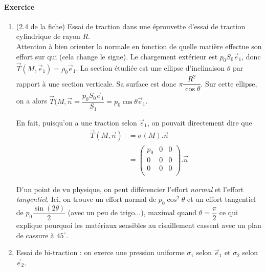 \documentclass{article}
\begin{document}
\paragraph{Exercice}
\begin{enumerate}
\item (2.4 de la fiche) 
Essai de traction dans une éprouvette d'essai de traction cylindrique de rayon $R$.\\
Attention à bien orienter la normale en fonction de quelle matière effectue son effort sur qui (cela change le signe). Le chargement extérieur est $p_0 S_0 \vec{e}_1$, donc $\vec{T}(M,\vec{e}_1)=\rho_0 \vec{e}_1$. La section étudiée est une ellipse d'inclinaison $\theta$ par rapport à  une section verticale. Sa surface est donc $\pi \dfrac{R^2}{\cos \theta}$. Sur cette ellipse, on a alors $\vec{T}(M,\vec{n}=\dfrac{p_0 S_0 \vec{e}_1}{S_1}=p_0\cos \theta \vec{e}_1$.

En fait, puisqu'on a une traction selon $\vec{e}_1$, on pouvait directement dire que
\begin{align*}
\vec{T}(M,\vec{n}) & = \sigma (M).\vec{n}\\
& = \begin{pmatrix}
p_0 & 0 & 0 \\
0 & 0 & 0\\
0 & 0 & 0\\
\end{pmatrix} . \vec{n}
\end{align*}

D'un point de vu physique, on peut différencier l'effort \emph{normal} et l'effort \emph{tangentiel}. Ici, on trouve un effort normal de $p_0\cos^2 \theta$ et un effort tangentiel de $p_0 \dfrac{\sin (2\theta)}{2}$ (avec un peu de trigo...), maximal quand $\theta = \dfrac{\pi}{2}$ ce qui explique pourquoi les matériaux sensibles au cisaillement cassent avec un plan de cassure à $45^\circ$.

\item Essai de bi-traction : on exerce une pression uniforme $\sigma_1$ selon $\vec{e}_1$ et $\sigma_2$ selon $\vec{e}_2$.


\end{enumerate}
\end{document}
